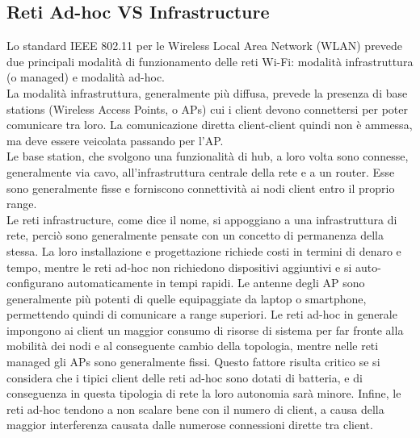 \subsection[Reti Infrastructure VS reti Ad-hoc]{Reti Ad-hoc VS Infrastructure}
Lo standard IEEE 802.11 per le Wireless Local Area Network (WLAN) prevede due principali modalità di funzionamento delle reti Wi-Fi: modalità infrastruttura (o managed) e modalità ad-hoc. \\
La modalità infrastruttura, generalmente più diffusa, prevede la presenza di base stations (Wireless Access Points, o APs) cui i client devono connettersi per poter comunicare tra loro. La comunicazione diretta client-client quindi non è ammessa, ma deve essere veicolata passando per l'AP. \\
Le base station, che svolgono una funzionalità di hub, a loro volta sono connesse, generalmente via cavo, all'infrastruttura centrale della rete e a un router. Esse sono generalmente fisse e forniscono connettività ai nodi client entro il proprio range.\\
Le reti infrastructure, come dice il nome, si appoggiano a una infrastruttura di rete, perciò sono generalmente pensate con un concetto di permanenza della stessa. 
La loro installazione e progettazione richiede costi in termini di denaro e tempo, mentre le reti ad-hoc non richiedono dispositivi aggiuntivi e si auto-configurano automaticamente in tempi rapidi. 
Le antenne degli AP sono generalmente più potenti di quelle equipaggiate da laptop o smartphone, permettendo quindi di comunicare a range superiori.  
Le reti ad-hoc in generale impongono ai client un maggior consumo di risorse di sistema per far fronte alla mobilità dei nodi e al conseguente cambio della topologia, mentre nelle reti managed gli APs sono generalmente fissi. Questo fattore risulta critico se si considera che i tipici client delle reti ad-hoc sono dotati di batteria, e di conseguenza in questa tipologia di rete la loro autonomia sarà minore.
Infine, le reti ad-hoc tendono a non scalare bene con il numero di client, a causa della maggior interferenza causata dalle numerose connessioni dirette tra client.\\

